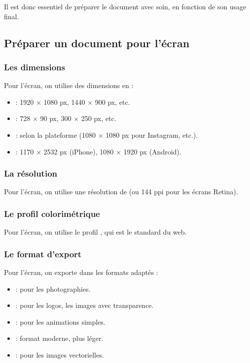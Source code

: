 Il est donc essentiel de préparer le document avec soin, en fonction de son usage final.

\subsection{Préparer un document pour l'écran}

\subsubsection{Les dimensions}

Pour l'écran, on utilise des dimensions en  :

\begin{itemize}
    \item {} : 1920 × 1080 px, 1440 × 900 px, etc.
    \item {} : 728 × 90 px, 300 × 250 px, etc.
    \item {} : selon la plateforme (1080 × 1080 px pour Instagram, etc.).
    \item {} : 1170 × 2532 px (iPhone), 1080 × 1920 px (Android).
\end{itemize}

\subsubsection{La résolution}

Pour l'écran, on utilise une résolution de  (ou 144 ppi pour les écrans Retina).

\subsubsection{Le profil colorimétrique}

Pour l'écran, on utilise le profil , qui est le standard du web.

\subsubsection{Le format d'export}

Pour l'écran, on exporte dans les formats adaptés :

\begin{itemize}
    \item {} : pour les photographies.
    \item {} : pour les logos, les images avec transparence.
    \item {} : pour les animations simples.
    \item {} : format moderne, plus léger.
    \item {} : pour les images vectorielles.
\end{itemize}

